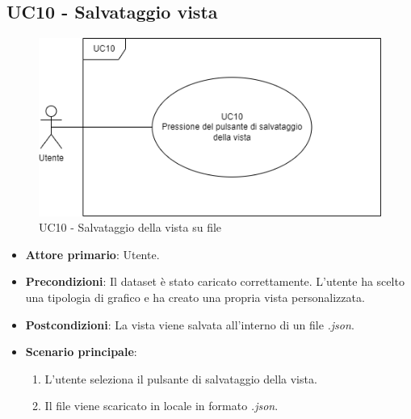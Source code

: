 \subsection{UC10 - Salvataggio vista}
\label{sec:UC10}
\begin{figure}[h!]
    \centering
    \includegraphics[scale=0.55]{../../assets/salvataggio_vista.png}
    \caption{UC10 - Salvataggio della vista su file}
\end{figure}
\begin{itemize}
    \item \textbf{Attore primario}: Utente.
    \item \textbf{Precondizioni}: Il dataset è stato caricato correttamente. L'utente ha scelto una tipologia di grafico e ha creato una propria vista personalizzata.
    \item \textbf{Postcondizioni}: La vista viene salvata all'interno di un file \textit{.json}.
    \item \textbf{Scenario principale}:
          \begin{enumerate}
              \item L'utente seleziona il pulsante di salvataggio della vista.
              \item Il file viene scaricato in locale in formato \textit{.json}.
          \end{enumerate}
\end{itemize}

\newpage

